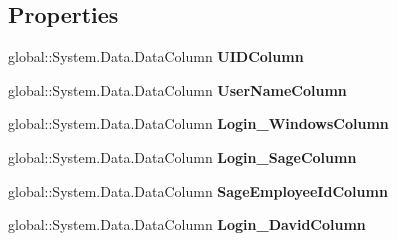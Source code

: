 \subsection*{Properties}
\begin{DoxyCompactItemize}
\item 
global\+::\+System.\+Data.\+Data\+Column {\bfseries U\+I\+D\+Column}\hypertarget{class_products_1_1_data_1_1ds_sage_1_1_user_data_table_a85f5246dcd712276a8007f1f4fc0e75e}{}\label{class_products_1_1_data_1_1ds_sage_1_1_user_data_table_a85f5246dcd712276a8007f1f4fc0e75e}

\item 
global\+::\+System.\+Data.\+Data\+Column {\bfseries User\+Name\+Column}\hypertarget{class_products_1_1_data_1_1ds_sage_1_1_user_data_table_ac4862539dd4f13044d25e82d68117efe}{}\label{class_products_1_1_data_1_1ds_sage_1_1_user_data_table_ac4862539dd4f13044d25e82d68117efe}

\item 
global\+::\+System.\+Data.\+Data\+Column {\bfseries Login\+\_\+\+Windows\+Column}\hypertarget{class_products_1_1_data_1_1ds_sage_1_1_user_data_table_a3ad994f63306b0543a194501d7e6c69c}{}\label{class_products_1_1_data_1_1ds_sage_1_1_user_data_table_a3ad994f63306b0543a194501d7e6c69c}

\item 
global\+::\+System.\+Data.\+Data\+Column {\bfseries Login\+\_\+\+Sage\+Column}\hypertarget{class_products_1_1_data_1_1ds_sage_1_1_user_data_table_a58b78ff1c98736457a7b97e29c7a941a}{}\label{class_products_1_1_data_1_1ds_sage_1_1_user_data_table_a58b78ff1c98736457a7b97e29c7a941a}

\item 
global\+::\+System.\+Data.\+Data\+Column {\bfseries Sage\+Employee\+Id\+Column}\hypertarget{class_products_1_1_data_1_1ds_sage_1_1_user_data_table_afc38f7c7fef2fa755f4dff040b589433}{}\label{class_products_1_1_data_1_1ds_sage_1_1_user_data_table_afc38f7c7fef2fa755f4dff040b589433}

\item 
global\+::\+System.\+Data.\+Data\+Column {\bfseries Login\+\_\+\+David\+Column}\hypertarget{class_products_1_1_data_1_1ds_sage_1_1_user_data_table_a028512c08b4ca119b76117359deb6638}{}\label{class_products_1_1_data_1_1ds_sage_1_1_user_data_table_a028512c08b4ca119b76117359deb6638}


\end{DoxyCompactItemize}
